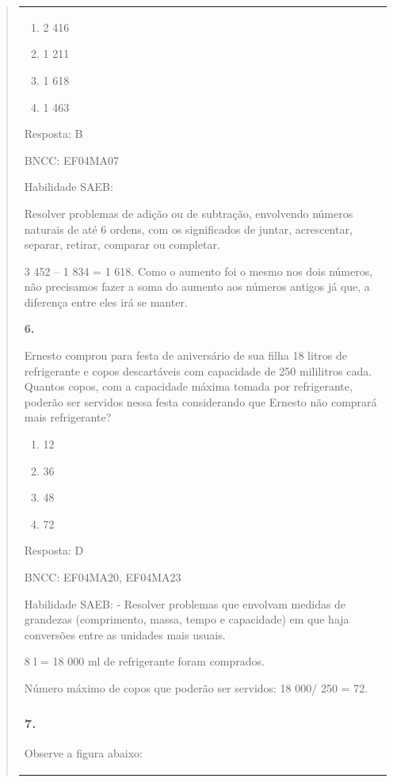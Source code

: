 \begin{enumerate}
\begin{escolha}
\begin{enumerate}
\begin{itemize}
\begin{itemize}
\begin{escolha}
\begin{quote}
\begin{escolha}
{\begin{longtable}[]{@{}l@{}}
\begin{itemize}
\begin{enumerate}
\def\labelenumi{\alph{enumi})}
\item
  2 416
\item
  1 211
\item
  1 618
\item
  1 463
\end{enumerate}

Resposta: B

BNCC: EF04MA07

Habilidade SAEB:

Resolver problemas de adição ou de subtração, envolvendo números
naturais de até 6 ordens, com os significados de juntar, acrescentar,
separar, retirar, comparar ou completar.

3 452 -- 1 834 = 1 618. Como o aumento foi o mesmo nos dois números, não
precisamos fazer a soma do aumento aos números antigos já que, a
diferença entre eles irá se manter.

\textbf{6.}

Ernesto comprou para festa de aniversário de sua filha 18 litros de
refrigerante e copos descartáveis com capacidade de 250 mililitros cada.
Quantos copos, com a capacidade máxima tomada por refrigerante, poderão
ser servidos nessa festa considerando que Ernesto não comprará mais
refrigerante?

\begin{enumerate}
\def\labelenumi{\alph{enumi})}
\item
  12
\item
  36
\item
  48
\item
  72
\end{enumerate}

Resposta: D

BNCC: EF04MA20, EF04MA23

Habilidade SAEB: - Resolver problemas que envolvam medidas de grandezas
(comprimento, massa, tempo e capacidade) em que haja conversões entre as
unidades mais usuais.

8 l = 18 000 ml de refrigerante foram comprados.

Número máximo de copos que poderão ser servidos: 18 000/ 250 = 72.

\subsubsection{7.}\label{section-148}

Observe a figura abaixo:


\end{itemize}
\end{longtable}}
\end{escolha}
\end{quote}
\end{escolha}
\end{itemize}
\end{itemize}
\end{enumerate}
\end{escolha}
\end{enumerate}
